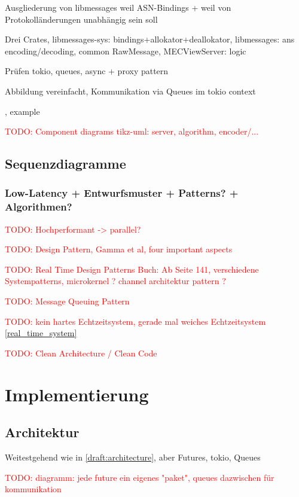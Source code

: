 \documentclass[
	12pt,
	table,
	bigheadings,
	ngerman,
	a4paper,
	BCOR5mm,
	DIV14,
	1.1headlines,
	pagesize,
	oneside,
	openright,
	titlepage,
	headsepline,
	nochapterprefix,
	bibtotoc,
	tocindent,
	listsindent,
	pointlessnumbers,
	cleardoubleempty,
	fleqn,
	halfparskip
]{scrbook}
\newcommand{\todo}[1]{\textcolor{red}{TODO: #1}}
\begin{document}
		
		
		Ausgliederung von libmessages weil ASN-Bindings + weil von Protokolländerungen unabhängig sein soll
		
		Drei Crates, libmessages-sys: bindings+allokator+deallokator, libmessages: ans encoding/decoding, common RawMessage, MECViewServer: logic
		
		Prüfen tokio, queues, async + proxy pattern
		
		Abbildung vereinfacht, Kommunikation via Queues im tokio context
		
		
		\cite[446]{goll2012methoden}, example \cite[457]{goll2012methoden}
		  
		\todo{Component diagrams tikz-uml: server, algorithm, encoder/...}		
		
		\section{Sequenzdiagramme}
		
		\subsection{Low-Latency + Entwurfsmuster + Patterns? + Algorithmen?}
		\todo{Hochperformant -> parallel?}
		
		\todo{Design Pattern, Gamma et al, four important aspects}
		
		\todo{Real Time Design Patterns Buch: Ab Seite 141, verschiedene Systempatterns, microkernel \cite[151]{douglass2003real}? channel architektur pattern \cite[167]{douglass2003real}?}
		
		\todo{Message Queuing Pattern \cite[207]{douglass2003real}}
		
		\todo{kein hartes Echtzeitsystem, gerade mal weiches Echtzeitsystem \autoref{real_time_system}}
		
		\todo{Clean Architecture / Clean Code}
	
	\chapter{Implementierung}
	
	\section{Architektur}
	
	Weitestgehend wie in \autoref{draft:architecture}, aber Futures, tokio, Queues
	
	\todo{diagramm: jede future ein eigenes "paket", queues dazwischen für kommunikation}
	
\end{document}
